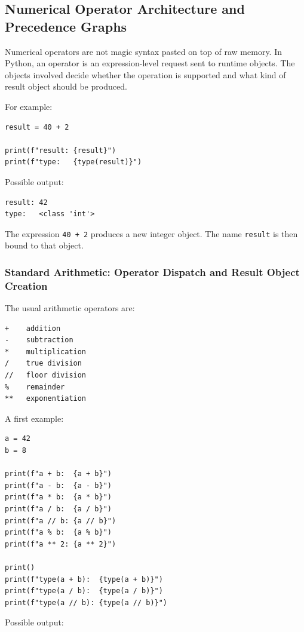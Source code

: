 \subsection{Numerical Operator Architecture and Precedence Graphs}

Numerical operators are not magic syntax pasted on top of raw memory. In Python, an operator is an expression-level request sent to runtime objects. The objects involved decide whether the operation is supported and what kind of result object should be produced.

For example:

\begin{verbatim}
result = 40 + 2

print(f"result: {result}")
print(f"type:   {type(result)}")
\end{verbatim}

Possible output:

\begin{verbatim}
result: 42
type:   <class 'int'>
\end{verbatim}

The expression \texttt{40 + 2} produces a new integer object. The name \texttt{result} is then bound to that object.

\subsubsection{Standard Arithmetic: Operator Dispatch and Result Object Creation}

The usual arithmetic operators are:

\begin{verbatim}
+    addition
-    subtraction
*    multiplication
/    true division
//   floor division
%    remainder
**   exponentiation
\end{verbatim}

A first example:

\begin{verbatim}
a = 42
b = 8

print(f"a + b:  {a + b}")
print(f"a - b:  {a - b}")
print(f"a * b:  {a * b}")
print(f"a / b:  {a / b}")
print(f"a // b: {a // b}")
print(f"a % b:  {a % b}")
print(f"a ** 2: {a ** 2}")

print()
print(f"type(a + b):  {type(a + b)}")
print(f"type(a / b):  {type(a / b)}")
print(f"type(a // b): {type(a // b)}")
\end{verbatim}

Possible output:

